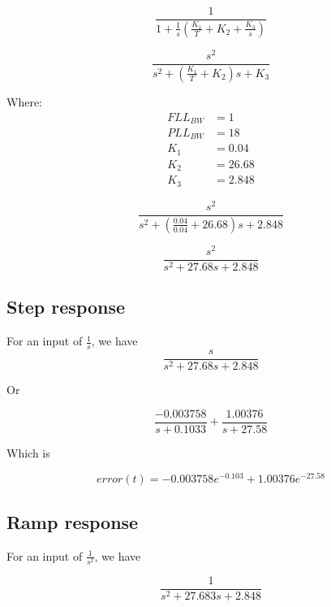\begin{equation}
\frac{1}{1+\frac{1}{s} (\frac{K_1}{T} + K_2 +  \frac{K_3}{s})}
\end{equation}



\begin{equation}
\frac{s^2}{s^2 + (\frac{K_1}{T} + K_2)s + K_3}
\end{equation}

Where:
\begin{align*}
FLL_{BW} &=1\\
PLL_{BW} &=18\\
K_1 &=  0.04\\
K_2 &= 26.68\\
K_3 &=  2.848
\end{align*}


\begin{equation}
\frac{s^2}{s^2 + (\frac{0.04}{0.04} +  26.68)s + 2.848}
\end{equation}

\begin{equation}
\frac{s^2}{s^2 + 27.68 s + 2.848}
\end{equation}

\subsection{Step response}

For an input of $\frac{1}{s}$, we have 
\begin{equation}
\frac{s}{s^2 + 27.68 s + 2.848}
\end{equation}

Or 

\begin{equation}
\frac{-0.003758}{s+0.1033} + \frac{1.00376}{s+27.58}
\end{equation}

Which is

\begin{equation}
error(t) =  -0.003758 e^{-0.103} + 1.00376 e^{-27.58}
\end{equation}


\subsection{Ramp response}

For an input of $\frac{1}{s^2}$, we have 

\begin{equation}
\frac{1}{s^2 + 27.683 s + 2.848}
\end{equation}

